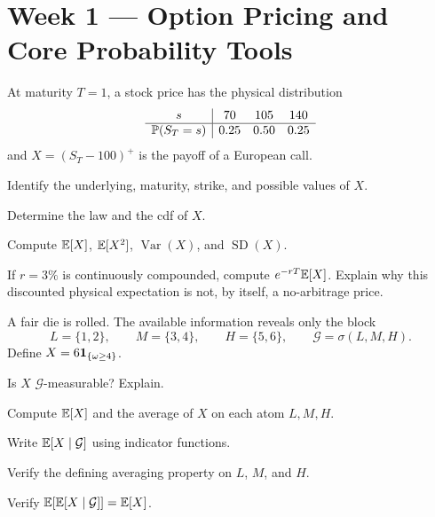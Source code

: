 
\section{Week 1 --- Option Pricing and Core Probability Tools}

\ifIncludeCore

\setcounter{exercise}{0}
\begin{exercise}
At maturity $T=1$, a stock price has the physical distribution
\[
\begin{array}{c|ccc}
s & 70 & 105 & 140\\ \hline
\mathbb P(S_T=s) & 0.25 & 0.50 & 0.25
\end{array}
\]
and $X=(S_T-100)^+$ is the payoff of a European call.
\begin{exparts}
  \item Identify the underlying, maturity, strike, and possible values of $X$.
  \item Determine the law and the cdf of $X$.
  \item Compute $\mathbb E[X]$, $\mathbb E[X^2]$, $\operatorname{Var}(X)$, and
  $\operatorname{SD}(X)$.
  \item If $r=3\%$ is continuously compounded, compute $e^{-rT}\mathbb E[X]$.
  Explain why this discounted physical expectation is not, by itself, a
  no-arbitrage price.
\end{exparts}
\end{exercise}

\begin{exercise}
A fair die is rolled. The available information reveals only the block
\[
L=\{1,2\},\qquad M=\{3,4\},\qquad H=\{5,6\},
\qquad \mathcal G=\sigma(L,M,H).
\]
Define $X=6\mathbf{1}_{\{\omega\geq4\}}$.
\begin{exparts}
  \item Is $X$ $\mathcal G$-measurable? Explain.
  \item Compute $\mathbb E[X]$ and the average of $X$ on each atom $L,M,H$.
  \item Write $\mathbb E[X\mid\mathcal G]$ using indicator functions.
  \item Verify the defining averaging property on $L$, $M$, and $H$.
  \item Verify $\mathbb E[\mathbb E[X\mid\mathcal G]]=\mathbb E[X]$.
\end{exparts}
\end{exercise}

